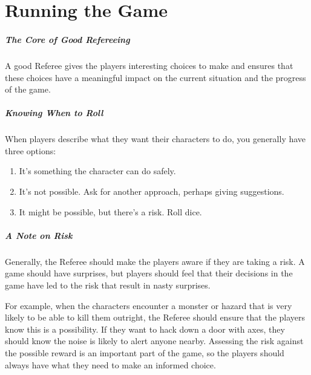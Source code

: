 \documentclass[itdr]{subfiles}
\begin{document}

\chapter{Running the Game}
\label{ch:running_the_game}

\paragraph{The Core of Good Refereeing}
A good Referee gives the players interesting choices to make and ensures that these choices have a meaningful impact on the current situation and the progress of the game.

\vfill

\paragraph{Knowing When to Roll}
When players describe what they want their characters to do, you generally have three options:
\begin{enumerate}
	\item It's something the character can do safely.
	\item It's not possible. Ask for another approach, \mbox{perhaps} giving suggestions.
	\item It might be possible, but there's a risk. Roll dice.
\end{enumerate}

\vfill

\paragraph{A Note on Risk}
Generally, the Referee should make the players aware if they are taking a risk. A game should have surprises, but players should feel that their decisions in the game have led to the risk that result in nasty surprises.

For example, when the characters encounter a monster or hazard that is very likely to be able to kill them outright, the Referee should ensure that the players know this is a possibility. If they want to hack down a door with axes, they should know the noise is likely to alert anyone nearby. Assessing the risk against the possible reward is an important part of the game, so the players should always have what they need to make an informed choice.

\vfill
\end{document}
